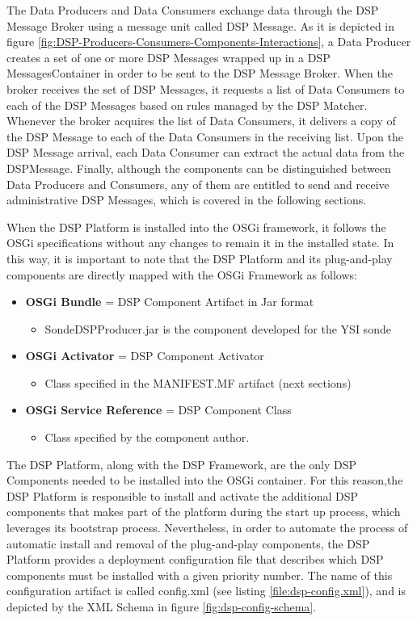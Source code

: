 The Data Producers and Data Consumers exchange data through the DSP Message
Broker using a message unit called DSP Message. As it is depicted in figure
\ref{fig:DSP-Producers-Consumers-Components-Interactions}, a Data Producer
creates a set of one or more DSP Messages wrapped up in a DSP
MessagesContainer in order to be sent to the DSP Message Broker. When the
broker receives the set of DSP Messages, it requests a list of Data Consumers
to each of the DSP Messages based on rules managed by the DSP Matcher.
Whenever the broker acquires the list of Data Consumers, it delivers a copy of
the DSP Message to each of the Data Consumers in the receiving list. Upon the
DSP Message arrival, each Data Consumer can extract the actual data from the
DSPMessage. Finally, although the components can be distinguished between Data
Producers and Consumers, any of them are entitled to send and receive
administrative DSP Messages, which is covered in the following sections.

When the DSP Platform is installed into the OSGi framework, it follows the
OSGi specifications without any changes to remain it in the installed state.
In this way, it is important to note that the DSP Platform and its
plug-and-play components are directly mapped with the OSGi Framework as
follows:

\begin{itemize}
  \item \textbf{OSGi Bundle} = DSP Component Artifact in Jar format
  \begin{itemize}
    \item SondeDSPProducer.jar is the component developed for the YSI sonde
  \end{itemize}  
  \item \textbf{OSGi Activator} = DSP Component Activator
  \begin{itemize}
    \item Class specified in the MANIFEST.MF artifact (next sections)
  \end{itemize} 
  \item \textbf{OSGi Service Reference} = DSP Component Class
  \begin{itemize}
    \item  Class specified by the component author.
  \end{itemize}
\end{itemize}

The DSP Platform, along with the DSP Framework, are the only DSP Components
needed to be installed into the OSGi container. For this reason,the DSP
Platform is responsible to install and activate the additional DSP components
that makes part of the platform during the start up process, which leverages
its bootstrap process. Nevertheless, in order to automate the process of
automatic install and removal of the plug-and-play components, the DSP Platform
provides a deployment configuration file that describes which DSP components
must be installed with a given priority number. The name of this configuration
artifact is called config.xml (see listing \ref{file:dsp-config.xml}), and is
depicted by the XML Schema \cite{xml-schema} in figure
\ref{fig:dsp-config-schema}.

